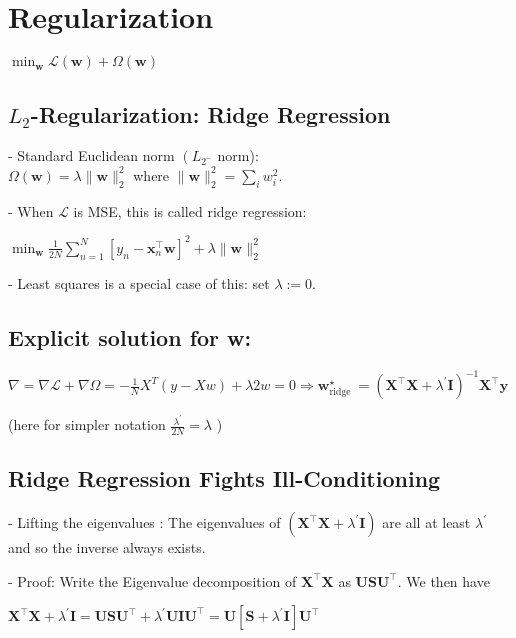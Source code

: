 \section*{Regularization}
$
\min _{\mathbf{w}} \mathcal{L}(\mathbf{w})+\Omega(\mathbf{w})
$

\subsection*{$L_{2}$-Regularization: Ridge Regression}
- Standard Euclidean norm $\left(L_{2^{-}}\right.$ norm):\\ $
\Omega(\mathbf{w})=\lambda\|\mathbf{w}\|_{2}^{2}
$ where $\|\mathbf{w}\|_{2}^{2}=\sum_{i} w_{i}^{2}$. 

- When $\mathcal{L}$ is MSE, this is called ridge regression:

$\min _{\mathbf{w}} \frac{1}{2 N} \sum_{n=1}^{N}\left[y_{n}-\mathbf{x}_{n}^{\top} \mathbf{w}\right]^{2}+\lambda\|\mathbf{w}\|_{2}^{2}$

- Least squares is a special case of this: set $\lambda:=0$.

\subsection*{Explicit solution for w:}

$\nabla = \nabla \mathcal{L} + \nabla\Omega = -\frac1NX^T(y-Xw) + \lambda2w = 0 \Rightarrow \mathbf{w}_{\text {ridge }}^{\star}=\left(\mathbf{X}^{\top} \mathbf{X}+\lambda^{\prime} \mathbf{I}\right)^{-1} \mathbf{X}^{\top} \mathbf{y}$

(here for simpler notation $\frac{\lambda^{\prime}}{2 N}=\lambda$ )

\subsection*{Ridge Regression Fights Ill-Conditioning}
- Lifting the eigenvalues : The eigenvalues of $\left(\mathbf{X}^{\top} \mathbf{X}+\lambda^{\prime} \mathbf{I}\right)$ are all at least $\lambda^{\prime}$ and so the inverse always exists.

- Proof: Write the Eigenvalue decomposition of $\mathbf{X}^{\top} \mathbf{X}$ as $\mathbf{U S U}^{\top}$. We then have

$
\mathbf{X}^{\top} \mathbf{X}+\lambda^{\prime} \mathbf{I} =\mathbf{U S} \mathbf{U}^{\top}+\lambda^{\prime} \mathbf{U I U}^{\top} =\mathbf{U}\left[\mathbf{S}+\lambda^{\prime} \mathbf{I}\right] \mathbf{U}^{\top}
$



